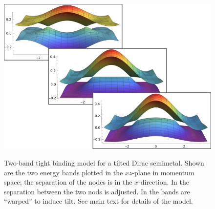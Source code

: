 \begin{figure}[p]
\begin{subcaptionblock}[t]{\textwidth}
{    }{%
      \includegraphics[width=.7\textwidth]{figures/bendingTransition-small}
    }
    \caption{\label{fig:typeii:bendbands}The ``warping'' parameter \( \gamma \) increased from left to right, %
      \( \gamma = 0, 2 t, 3 t \), %
      transitioning the system from Type-I to Type-II.}
  \end{subcaptionblock}
  \caption{Two-band tight binding model for a tilted Dirac semimetal.
    Shown are the two energy bands plotted in the \( xz \)-plane in momentum space;
    the separation of the nodes is in the \( x \)-direction.
    In  the separation between the two nods is adjusted.
    In  the bands are ``warped'' to induce tilt.
    See main text for details of the model.
  }
\end{figure}

